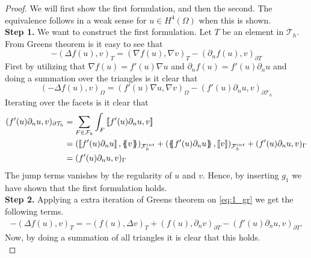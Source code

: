 \begin{proof}

    We will first show the first formulation, and then the second. The equivalence follows in a weak sense for $u \in H^{4}( \Omega ) $  when this is shown.
        \\ \textbf{Step 1.}  We want to construct the first formulation. Let $T$ be an element in $\mathcal{T}_{h}$. From Greens theorem is it easy to see that
            \begin{equation}
            \label{eq:1_gr}
-(\Delta f( u) , v)_{T } = (\nabla f( u), \nabla v  )_{T } - ( \partial _{n}  f( u), v )_{\partial T }
            \end{equation}
            First by utilizing that $\nabla f( u) = f' ( u) \nabla u $ and $\partial _{n}f( u)  = f' ( u)  \partial _{n}u$  and doing a summation over the triangles  is it clear that \[
            ( -\Delta f( u),v )_{\Omega  } =(f' ( u) \nabla u, \nabla v  )_{\Omega  } - (   f' ( u)\partial _{n}u, v )_{\partial \mathcal{T}_{h}  }
            \]
            Iterating over the facets is it clear that \[
                \begin{split}
            (   f' ( u)\partial _{n}u, v )_{\partial \mathcal{T}_{h}  } & = \sum_{F \in \mathcal{F}_{h}  }^{} \int_{F}^{}   \jump{ f' ( u)\partial _{n}u, v } \\
                                                                        & =  ( \jump{ f' ( u) \partial _{n}u },  \mean{v}    )_{\mathcal{F}^{int}_{h} } + ( \mean{ f' ( u) \partial _{n}u }, \jump{ v }    )_{\mathcal{F}^{int}_{h} } +  ( f' ( u) \partial _{n}u, v) _{\Gamma } \\
                                                                        & =  ( f' ( u) \partial _{n}u, v) _{\Gamma }
                \end{split}
            \]
            The jump terms vanishes by the regularity of $u$ and $v$. Hence, by inserting $g_{1}$ we have shown that the first formulation holds.
         \\ \textbf{Step 2.}  Applying a extra iteration of Greens theorem on \eqref{eq:1_gr} we get the following terms.
\[
    \begin{split}
-(\Delta f( u) , v)_{T }  = -( f( u), \Delta v )_{T} + (f( u), \partial _{n} v  )_{\partial T} - (   f'( u)\partial _{n}u, v )_{\partial T } .
    \end{split}
\]
Now, by doing a summation of all triangles it is clear that this holds.
\begin{equation}

\end{equation}
\end{proof}
